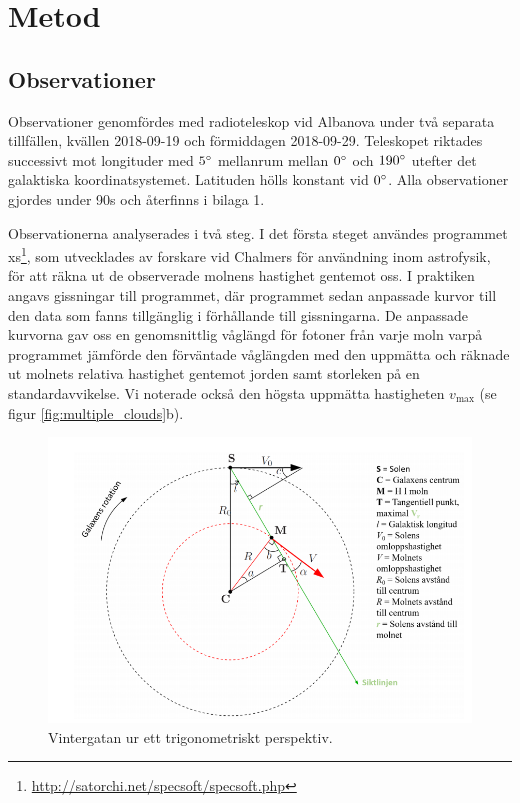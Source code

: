 \chapter{Metod}

\section{Observationer}
Observationer genomfördes med radioteleskop vid Albanova under två separata tillfällen, kvällen 2018-09-19 och förmiddagen 2018-09-29. Teleskopet riktades successivt mot longituder med $5\degree$ mellanrum mellan $0\degree$ och $190\degree$ utefter det galaktiska koordinatsystemet. Latituden hölls konstant vid $0\degree$. Alla observationer gjordes under 90s och återfinns i bilaga 1.

Observationerna analyserades i två steg. I det första steget användes programmet xs\footnote{\url{http://satorchi.net/specsoft/specsoft.php}}, som utvecklades av forskare vid Chalmers för användning inom astrofysik, för att räkna ut de observerade molnens hastighet gentemot oss. I praktiken angavs gissningar till programmet, där programmet sedan anpassade kurvor till den data som fanns tillgänglig i förhållande till gissningarna. De anpassade kurvorna gav oss en genomsnittlig våglängd för fotoner från varje moln varpå programmet jämförde den förväntade våglängden med den uppmätta och räknade ut molnets relativa hastighet gentemot jorden samt storleken på en standardavvikelse. Vi noterade också den högsta uppmätta hastigheten $v_{\mathrm{max}}$ (se figur \ref{fig:multiple_clouds}b).

\begin{figure}
    \centering
    \includegraphics[width=\textwidth]{pics/trigonometri.png}
    \caption{Vintergatan ur ett trigonometriskt perspektiv.}
    \label{fig:trig}
\end{figure}

